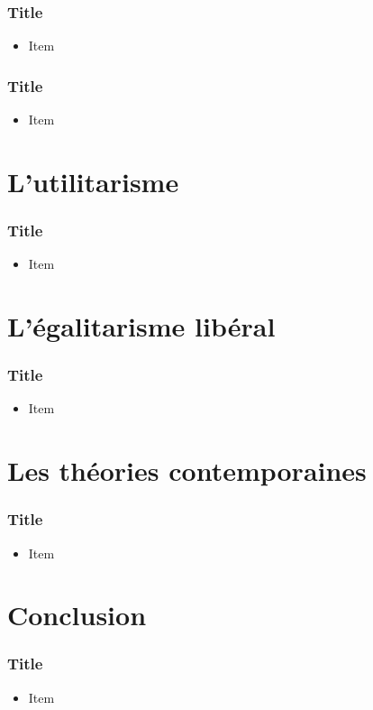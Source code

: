 \documentclass[french]{beamer}
\begin{document}
\begin{frame}
	\frametitle{Title}
	\begin{itemize}
		\item Item
	\end{itemize}
\end{frame}

\begin{frame}
	\frametitle{Title}
	\begin{itemize}
		\item Item
	\end{itemize}
\end{frame}

\section{L’utilitarisme}
\begin{frame}
	\frametitle{Title}
	\begin{itemize}
		\item Item
	\end{itemize}
\end{frame}

\section{L’égalitarisme libéral}
\begin{frame}
	\frametitle{Title}
	\begin{itemize}
		\item Item
	\end{itemize}
\end{frame}

\section{Les théories contemporaines}
\begin{frame}
	\frametitle{Title}
	\begin{itemize}
		\item Item
	\end{itemize}
\end{frame}

\section{Conclusion}
\begin{frame}
	\frametitle{Title}
	\begin{itemize}
		\item Item
	\end{itemize}
\end{frame}
\end{document}
